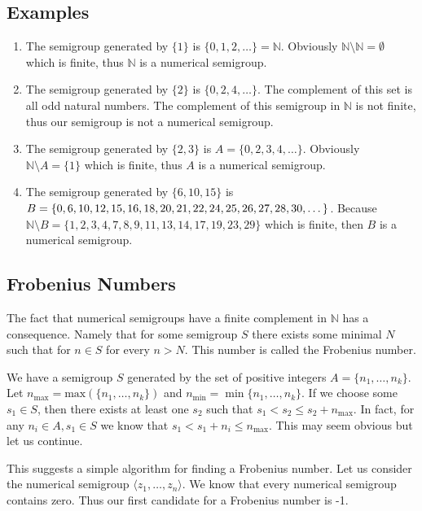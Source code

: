 \documentclass[11pt]{amsart}
\theoremstyle{plain}
\theoremstyle{definition}
\begin{document}
\subsection{Examples}
\begin{enumerate}
  \item
  The semigroup generated by $\{1\}$ is $\{0,1,2,\dots \}=\mathbb{N}$. Obviously
  $\mathbb{N}\setminus \mathbb{N}=\emptyset$ which is finite, thus $\mathbb{N}$
  is a numerical semigroup.
  \item
  The semigroup generated by $\{2\}$ is $\{0,2,4,\dots \}$. The complement of
  this set is all odd natural numbers. The complement of this semigroup in
  $\mathbb{N}$ is not finite, thus our semigroup is not a numerical semigroup.
  \item
  The semigroup generated by $\{2,3\}$ is $A=\{0,2,3,4,\dots \}$. Obviously
  $\mathbb{N}\setminus A=\{1\}$ which is finite, thus $A$ is a numerical
  semigroup.
  \item
  The semigroup generated by $\{6,10,15\}$ is $B=\{0, 6, 10, 12, 15, 16, 18,
  20, 21, 22, 24, 25,\\26, 27, 28, 30, \dots \}$. Because $\mathbb{N}\setminus
  B=\{1,2,3,4,7,8,9,11,13,
  14,17,19,23,29\}$ which is finite, then $B$ is a numerical semigroup.
\end{enumerate}
\subsection{Frobenius Numbers}
The fact that numerical semigroups have a finite complement in $\mathbb{N}$ has
a consequence. Namely that for some semigroup $S$ there exists some minimal $N$
such that for $n\in S$ for every  $n>N$. This number is called the Frobenius
number.

We have a semigroup $S$ generated by the set of positive integers
$A=\{ n_1,\dots,n_k\}$. Let $n_\text{max}=\text{max}(\{n_1,\dots,n_k\})$ and
$n_{\min{}}=\min{\{n_1,\dots,n_k\}}$. If we choose some $s_1\in S$, then
there exists at least one $s_2$ such that $s_1<s_2\le s_2+n_{\max{}}$. In
fact, for any $n_i\in A,s_1\in S$ we know that
$s_1<s_1+n_i\le n_\text{max}$. This may seem obvious but let us continue.

This suggests a simple algorithm for finding a Frobenius number. Let us consider the numerical semigroup $\langle z_1,\dots,z_n\rangle$. We know that every numerical semigroup contains zero. Thus our first candidate for a Frobenius number is -1.
\end{document}

